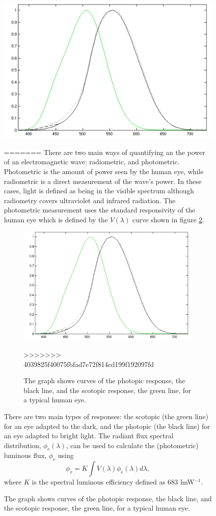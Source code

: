 \begin{figure}[H]
	\includegraphics[width=\linewidth]{eye}
	\caption{The graph shows the curve for the photopic response, the black line, and the scotopic response, the green line, of a standard human eye}
	\label{fig:ItP:eye}
=======
There are two main ways of quantifying an the power of an electromagnetic wave: radiometric, and photometric.
 Photometric is the amount of power seen by the human eye, while radiometric is a direct measurement of the wave's power.
 In these cases, light is defined as being in the visible spectrum although radiometry covers ultraviolet and infrared radiation.
 The photometric measurement uses the standard responsivity of the human eye which is defined by the $V(\lambda)$ curve  shown in figure \ref{fig:eye}.
%
\begin{figure}[H]
	\includegraphics[width=\linewidth]{eye}
	\caption{The graph shows curves of the photopic response, the black line, and the scotopic response, the green line, for a typical human eye.}
	\label{fig:eye}
>>>>>>> 4039825f40075fbfad7e72f814cd199f192097fd
\end{figure}
%
There are two main types of responses: the scotopic (the green line) for an eye adapted to the dark, and the photopic (the black line) for an eye adapted to bright light.
 The radiant flux spectral distribution, $\phi_e(\lambda)$, can be used to calculate the (photometric) luminous flux, $\phi_v$ using
%
\begin{equation}
	\phi_v = K\int{V(\lambda)\phi_e(\lambda)d\lambda},
	\label{eq:luminous}
\end{equation}
%
where $K$ is the spectral luminous efficiency defined as $683$ lmW$^{-1}$.

\end{figure}
